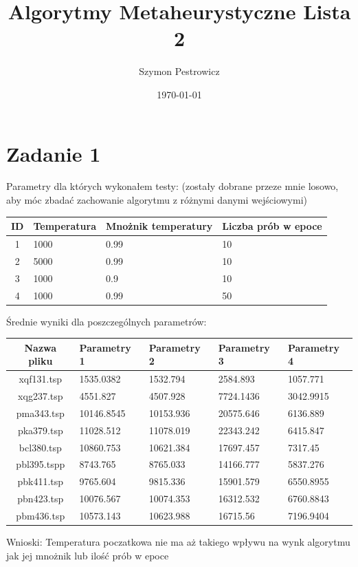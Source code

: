 \documentclass{article} %
\title{Algorytmy Metaheurystyczne Lista 2} %
\author{Szymon Pestrowicz} %
\date{\today} %
\begin{document}
	\maketitle %

	\section*{Zadanie 1} %

		Parametry dla których wykonałem testy:
		(zostały dobrane przeze mnie losowo, aby móc zbadać zachowanie algorytmu z różnymi danymi wejściowymi)

		\vspace{0.1cm}
			\begin{tabularx}{\textwidth}{|c|X|X|X|}
			\hline
			ID & Temperatura & Mnożnik temperatury & Liczba prób w epoce \\
			\hline
			1 &1000 & 0.99 & 10 \\
			\hline
			2 &5000 & 0.99 & 10 \\
			\hline
			3 &1000 &0.9 & 10 \\
			\hline
			4 &1000 & 0.99 & 50 \\
			\hline
			\end{tabularx}
		\vspace{0.1cm}

		Średnie wyniki dla poszczególnych parametrów:

		\vspace{0.1cm}
			\begin{tabularx}{\textwidth}{|c|X|X|X|X|}
			\hline
			Nazwa pliku & Parametry 1 & Parametry 2 & Parametry 3 & Parametry 4 \\
			\hline
			xqf131.tsp & 1535.0382 & 1532.794 & 2584.893 & 1057.771 \\
			\hline 
			xqg237.tsp & 4551.827 & 4507.928 & 7724.1436 & 3042.9915 \\
			\hline
			pma343.tsp & 10146.8545 & 10153.936 & 20575.646 & 6136.889 \\
			\hline
			pka379.tsp & 11028.512 & 11078.019 & 22343.242 & 6415.847 \\
			\hline
			bcl380.tsp & 10860.753 & 10621.384 & 17697.457 & 7317.45 \\
			\hline
			pbl395.tspp & 8743.765 & 8765.033 & 14166.777 & 5837.276 \\
			\hline
			pbk411.tsp & 9765.604 & 9815.336 & 15901.579 & 6550.8955 \\
			\hline 
			pbn423.tsp & 10076.567 & 10074.353 & 16312.532 & 6760.8843 \\
			\hline
			pbm436.tsp & 10573.143 & 10623.988 & 16715.56 & 7196.9404 \\
			\hline
			\end{tabularx}
		\vspace{0.1cm}

		Wnioski:
		Temperatura poczatkowa nie ma aż takiego wpływu na wynk algorytmu jak jej mnożnik lub ilość prób w epoce
\end{document}
